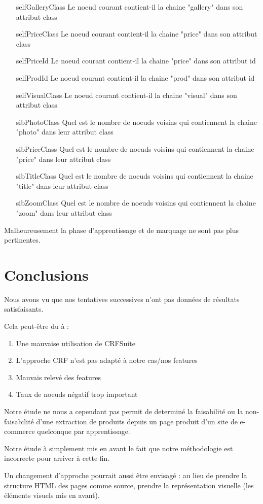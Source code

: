 \documentclass{article}
\begin{document}
\begin{itemize}
    \item[selfGalleryClass] Le noeud courant contient-il la chaine "gallery" dans son attribut class
    \item[selfPriceClass] Le noeud courant contient-il la chaine "price" dans son attribut class
    \item[selfPriceId] Le noeud courant contient-il la chaine "price" dans son attribut id
    \item[selfProdId] Le noeud courant contient-il la chaine "prod" dans son attribut id
    \item[selfVisualClass] Le noeud courant contient-il la chaine "visual" dans son attribut class
    \item[sibPhotoClass] Quel est le nombre de noeuds voisins qui contiennent la chaine "photo" dans leur attribut class
    \item[sibPriceClass] Quel est le nombre de noeuds voisins qui contiennent la chaine "price" dans leur attribut class
    \item[sibTitleClass] Quel est le nombre de noeuds voisins qui contiennent la chaine "title" dans leur attribut class
    \item[sibZoomClass] Quel est le nombre de noeuds voisins qui contiennent la chaine "zoom" dans leur attribut class
\end{itemize}

Malheureusement la phase d'apprentissage et de marquage ne sont pas plus pertinentes.

\section{Conclusions}
Nous avons vu que nos tentatives successives n'ont pas données de résultats satisfaisants.

Cela peut-être du à :
\begin{enumerate}
    \item Une mauvaise utilisation de CRFSuite
    \item L'approche CRF n'est pas adapté à notre cas/nos features
    \item Mauvais relevé des features
    \item Taux de noeuds négatif trop important
\end{enumerate}

Notre étude ne nous a cependant pas permit de determiné la faisabilité ou la non-faisabilité
d'une extraction de produits depuis un page produit d'un site de e-commerce quelconque par
apprentissage.

Notre étude à simplement mis en avant le fait que notre méthodologie est incorrecte pour
arriver à cette fin.

Un changement d'approche pourrait aussi être envisagé : au lieu de prendre la structure
HTML des pages comme source, prendre la représentation visuelle (les éléments visuels
mis en avant).
\end{document}
